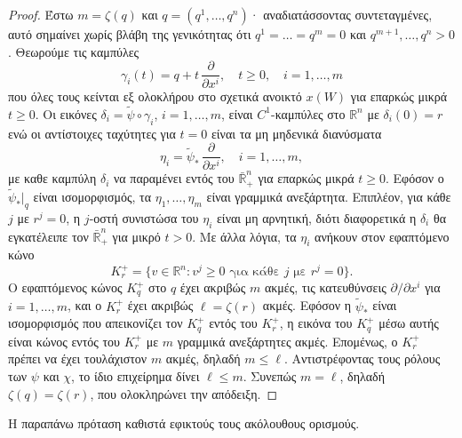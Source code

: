 \documentclass[11pt,a4paper,twoside,openright]{book}
\begin{document}
\begin{proof}
Έστω $m = \zeta(q)$ και $q = (q^1, \dots, q^n)$·
αναδιατάσσοντας συντεταγμένες,
αυτό σημαίνει χωρίς βλάβη της γενικότητας
ότι $q^1 = \dots = q^m = 0$ και $q^{m+1}, \dots, q^n > 0$.
Θεωρούμε τις καμπύλες
\begin{equation*}
\gamma_i(t) = q + t \, \frac{\partial}{\partial x^i},
\quad
t \ge 0,
\quad
i = 1, \dots, m
\end{equation*}
που όλες τους κείνται εξ ολοκλήρου στο σχετικά ανοικτό $x(W)$ για επαρκώς μικρά $t \ge 0$.
Οι εικόνες $\delta_i = \widetilde{\psi} \circ \gamma_i$, $i=1, \dots, m$, είναι $C^1$-καμπύλες
στο $\mathbb{R}^n$ με $\delta_i(0) = r$
ενώ οι αντίστοιχες ταχύτητες για $t=0$ είναι τα μη μηδενικά διανύσματα
\begin{equation*}
\eta_i = \widetilde{\psi}_*\, \frac{\partial}{\partial x^i},
\quad
i = 1, \dots, m,
\end{equation*}
με καθε καμπύλη $\delta_i$ να παραμένει εντός του $\bar{\mathbb{R}}^n_+$ για επαρκώς μικρά $t \ge 0$.
Εφόσον ο $\widetilde{\psi}_*|_q$ είναι ισομορφισμός, τα $\eta_1, \dots, \eta_m$ είναι γραμμικά ανεξάρτητα. Επιπλέον, για κάθε $j$ με $r^j = 0$, η $j$-οστή συνιστώσα του $\eta_i$ είναι μη αρνητική, διότι διαφορετικά η $\delta_i$ θα εγκατέλειπε τον $\bar{\mathbb{R}}^n_+$ για μικρό $t > 0$. Με άλλα λόγια, τα $\eta_i$ ανήκουν στον εφαπτόμενο κώνο
\begin{equation*}
K_r^+ = \{ v \in \mathbb{R}^n : v^j \ge 0 \text{ για κάθε } j \text{ με } r^j = 0 \}.
\end{equation*}
Ο εφαπτόμενος κώνος $K_q^+$ στο $q$ έχει ακριβώς $m$ ακμές, τις κατευθύνσεις $\partial/\partial x^i$ για $i = 1, \dots, m$, και ο $K_r^+$ έχει ακριβώς $\ell = \zeta(r)$ ακμές. Εφόσον η $\widetilde{\psi}_*$ είναι ισομορφισμός που απεικονίζει τον $K_q^+$ εντός του $K_r^+$, η εικόνα του $K_q^+$ μέσω αυτής είναι κώνος εντός του $K_r^+$ με $m$ γραμμικά ανεξάρτητες ακμές. Επομένως, ο $K_r^+$ πρέπει να έχει τουλάχιστον $m$ ακμές, δηλαδή $m \le \ell$.
Αντιστρέφοντας τους ρόλους των $\psi$ και $\chi$, το ίδιο επιχείρημα δίνει $\ell \le m$. Συνεπώς $m = \ell$, δηλαδή $\zeta(q) = \zeta(r)$, που ολοκληρώνει την απόδειξη.
\end{proof}
\noindent
H παραπάνω πρόταση καθιστά εφικτούς τους ακόλουθους ορισμούς.
\end{document}
